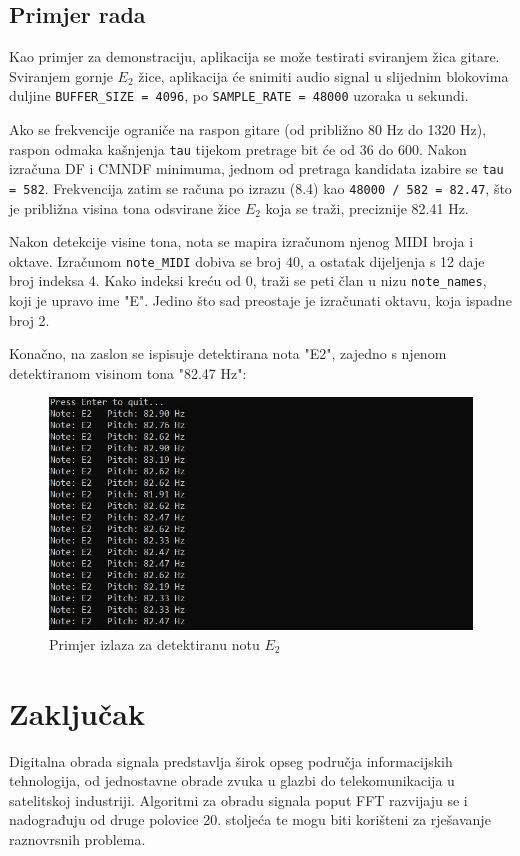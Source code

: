 \documentclass[times, utf8, diplomski, numeric]{fer}
\begin{document}
\section{Primjer rada}
%
Kao primjer za demonstraciju, aplikacija se može testirati sviranjem žica gitare. Sviranjem gornje $E_2$ žice, aplikacija će snimiti audio signal u slijednim blokovima duljine \verb*|BUFFER_SIZE = 4096|, po \verb*|SAMPLE_RATE = 48000| uzoraka u sekundi.

Ako se frekvencije ograniče na raspon gitare (od približno 80 Hz do 1320 Hz), raspon odmaka kašnjenja \verb*|tau| tijekom pretrage bit će od 36 do 600. Nakon izračuna DF i CMNDF minimuma, jednom od pretraga kandidata izabire se \verb*|tau = 582|. Frekvencija zatim se računa po izrazu (8.4) kao \verb*|48000 / 582 = 82.47|, što je približna visina tona odsvirane žice $E_2$ koja se traži, preciznije 82.41 Hz.

Nakon detekcije visine tona, nota se mapira izračunom njenog MIDI broja i oktave. Izračunom \verb*|note_MIDI| dobiva se broj 40, a ostatak dijeljenja s 12 daje broj indeksa 4. Kako indeksi kreću od 0, traži se peti član u nizu \verb*|note_names|, koji je upravo ime "E". Jedino što sad preostaje je izračunati oktavu, koja ispadne broj 2.

Konačno, na zaslon se ispisuje detektirana nota "E2", zajedno s njenom detektiranom visinom tona "82.47 Hz":

\begin{figure}
	\centerline{\includegraphics[width=1\textwidth]{example.png}}
	\caption{Primjer izlaza za detektiranu notu $E_2$}
	\label{fig}
\end{figure}

\chapter{Zaključak}
Digitalna obrada signala predstavlja širok opseg područja informacijskih tehnologija, od jednostavne obrade zvuka u glazbi do telekomunikacija u satelitskoj industriji. Algoritmi za obradu signala poput FFT razvijaju se i nadograđuju od druge polovice 20. stoljeća te mogu biti korišteni za rješavanje raznovrsnih problema.
\end{document}
